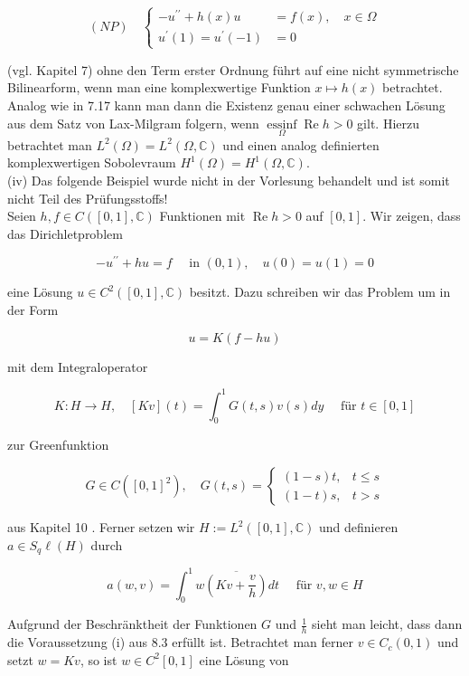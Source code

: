 \documentclass[10pt, letterpaper]{article}
\begin{document}
$$
(N P) \quad\left\{\begin{aligned}
-u^{\prime \prime}+h(x) u & =f(x), \quad x \in \Omega \\
u^{\prime}(1)=u^{\prime}(-1) & =0
\end{aligned}\right.
$$

(vgl. Kapitel 7) ohne den Term erster Ordnung führt auf eine nicht symmetrische Bilinearform, wenn man eine komplexwertige Funktion $x \mapsto h(x)$ betrachtet. Analog wie in 7.17 kann man dann die Existenz genau einer schwachen Lösung aus dem Satz von Lax-Milgram folgern, wenn $\underset{\Omega}{\operatorname{essinf}} \operatorname{Re} h>0$ gilt. Hierzu betrachtet man $L^{2}(\Omega)=L^{2}(\Omega, \mathbb{C})$ und einen analog definierten komplexwertigen Sobolevraum $H^{1}(\Omega)=H^{1}(\Omega, \mathbb{C})$.\\
(iv) Das folgende Beispiel wurde nicht in der Vorlesung behandelt und ist somit nicht Teil des Prüfungsstoffs!\\
Seien $h, f \in C([0,1], \mathbb{C})$ Funktionen mit $\operatorname{Re} h>0$ auf $[0,1]$. Wir zeigen, dass das Dirichletproblem

$$
-u^{\prime \prime}+h u=f \quad \text { in }(0,1), \quad u(0)=u(1)=0
$$

eine Lösung $u \in C^{2}([0,1], \mathbb{C})$ besitzt. Dazu schreiben wir das Problem um in der Form

$$
u=K(f-h u)
$$

mit dem Integraloperator

$$
K: H \rightarrow H, \quad[K v](t)=\int_{0}^{1} G(t, s) v(s) d y \quad \text { für } t \in[0,1]
$$

zur Greenfunktion

$$
G \in C\left([0,1]^{2}\right), \quad G(t, s)= \begin{cases}(1-s) t, & t \leq s \\ (1-t) s, & t>s\end{cases}
$$

aus Kapitel 10 . Ferner setzen wir $H:=L^{2}([0,1], \mathbb{C})$ und definieren $a \in S_{q} \ell(H)$ durch

$$
a(w, v)=\int_{0}^{1} w \overline{\left(K v+\frac{v}{h}\right)} d t \quad \text { für } v, w \in H
$$

Aufgrund der Beschränktheit der Funktionen $G$ und $\frac{1}{h}$ sieht man leicht, dass dann die Voraussetzung (i) aus 8.3 erfüllt ist. Betrachtet man ferner $v \in C_{c}(0,1)$ und setzt $w=K v$, so ist $w \in C^{2}[0,1]$ eine Lösung von
\end{document}
